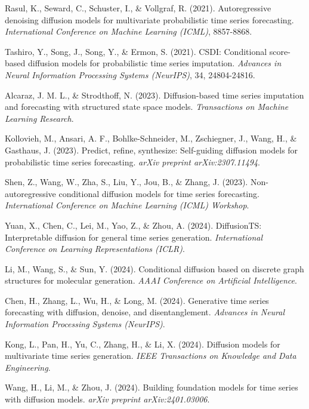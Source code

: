 \documentclass[11pt,a4paper]{article}
\begin{document}
\begin{thebibliography}{99}
Rasul, K., Seward, C., Schuster, I., \& Vollgraf, R. (2021).
Autoregressive denoising diffusion models for multivariate probabilistic time series forecasting.
\textit{International Conference on Machine Learning (ICML)}, 8857-8868.

Tashiro, Y., Song, J., Song, Y., \& Ermon, S. (2021).
CSDI: Conditional score-based diffusion models for probabilistic time series imputation.
\textit{Advances in Neural Information Processing Systems (NeurIPS)}, 34, 24804-24816.

Alcaraz, J. M. L., \& Strodthoff, N. (2023).
Diffusion-based time series imputation and forecasting with structured state space models.
\textit{Transactions on Machine Learning Research}.

Kollovieh, M., Ansari, A. F., Bohlke-Schneider, M., Zschiegner, J., Wang, H., \& Gasthaus, J. (2023).
Predict, refine, synthesize: Self-guiding diffusion models for probabilistic time series forecasting.
\textit{arXiv preprint arXiv:2307.11494}.

Shen, Z., Wang, W., Zha, S., Liu, Y., Jou, B., \& Zhang, J. (2023).
Non-autoregressive conditional diffusion models for time series forecasting.
\textit{International Conference on Machine Learning (ICML) Workshop}.

Yuan, X., Chen, C., Lei, M., Yao, Z., \& Zhou, A. (2024).
DiffusionTS: Interpretable diffusion for general time series generation.
\textit{International Conference on Learning Representations (ICLR)}.

Li, M., Wang, S., \& Sun, Y. (2024).
Conditional diffusion based on discrete graph structures for molecular generation.
\textit{AAAI Conference on Artificial Intelligence}.

Chen, H., Zhang, L., Wu, H., \& Long, M. (2024).
Generative time series forecasting with diffusion, denoise, and disentanglement.
\textit{Advances in Neural Information Processing Systems (NeurIPS)}.

Kong, L., Pan, H., Yu, C., Zhang, H., \& Li, X. (2024).
Diffusion models for multivariate time series generation.
\textit{IEEE Transactions on Knowledge and Data Engineering}.

Wang, H., Li, M., \& Zhou, J. (2024).
Building foundation models for time series with diffusion models.
\textit{arXiv preprint arXiv:2401.03006}.


\end{thebibliography}
\end{document}
